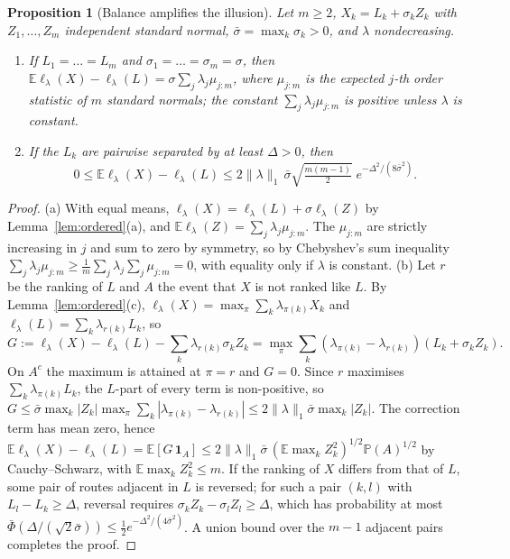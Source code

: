 \documentclass[11pt]{article}
\newtheorem{proposition}[theorem]{Proposition}
\theoremstyle{definition}
\newcommand{\E}{\mathbb{E}}
\newcommand{\Prob}{\mathbb{P}}
\newcommand{\lord}{\ell_\lambda}
\begin{document}
\begin{proposition}[Balance amplifies the illusion]\label{prop:balance}
Let $m\ge2$, $X_k=L_k+\sigma_kZ_k$ with $Z_1,\dots,Z_m$ independent standard
normal, $\bar\sigma=\max_k\sigma_k>0$, and $\lambda$ nondecreasing.
\begin{enumerate}
\item[(a)] If $L_1=\dots=L_m$ and $\sigma_1=\dots=\sigma_m=\sigma$, then
$\E\lord(X)-\lord(L)=\sigma\sum_j\lambda_j\mu_{j:m}$, where $\mu_{j:m}$ is the
expected $j$-th order statistic of $m$ standard normals; the constant
$\sum_j\lambda_j\mu_{j:m}$ is positive unless $\lambda$ is constant.
\item[(b)] If the $L_k$ are pairwise separated by at least $\Delta>0$, then
\[
0\le\E\lord(X)-\lord(L)\le 2\|\lambda\|_1\,\bar\sigma\sqrt{\tfrac{m(m-1)}{2}}\;e^{-\Delta^2/(8\bar\sigma^2)} .
\]
\end{enumerate}
\end{proposition}
\begin{proof}
(a) With equal means, $\lord(X)=\lord(L)+\sigma\lord(Z)$ by
Lemma~\ref{lem:ordered}(a), and $\E\lord(Z)=\sum_j\lambda_j\mu_{j:m}$. The
$\mu_{j:m}$ are strictly increasing in $j$ and sum to zero by symmetry, so by
Chebyshev's sum inequality $\sum_j\lambda_j\mu_{j:m}\ge\frac1m\sum_j\lambda_j\sum_j\mu_{j:m}=0$,
with equality only if $\lambda$ is constant.
(b) Let $r$ be the ranking of $L$ and $A$ the event that $X$ is not ranked
like $L$. By Lemma~\ref{lem:ordered}(c),
$\lord(X)=\max_\pi\sum_k\lambda_{\pi(k)}X_k$ and $\lord(L)=\sum_k\lambda_{r(k)}L_k$, so
\[
G:=\lord(X)-\lord(L)-\sum_k\lambda_{r(k)}\sigma_kZ_k
=\max_\pi\sum_k(\lambda_{\pi(k)}-\lambda_{r(k)})(L_k+\sigma_kZ_k).
\]
On $A^c$ the maximum is attained at $\pi=r$ and $G=0$. Since $r$ maximises
$\sum_k\lambda_{\pi(k)}L_k$, the $L$-part of every term is non-positive, so
$G\le\bar\sigma\max_k|Z_k|\max_\pi\sum_k|\lambda_{\pi(k)}-\lambda_{r(k)}|\le2\|\lambda\|_1\bar\sigma\max_k|Z_k|$.
The correction term has mean zero, hence
$\E\lord(X)-\lord(L)=\E[G\,\mathbf 1_A]\le2\|\lambda\|_1\bar\sigma\,(\E\max_kZ_k^2)^{1/2}\Prob(A)^{1/2}$
by Cauchy--Schwarz, with $\E\max_kZ_k^2\le m$. If the ranking of $X$
differs from that of $L$, some pair of routes adjacent in $L$ is reversed; for
such a pair $(k,l)$ with $L_l-L_k\ge\Delta$, reversal requires
$\sigma_kZ_k-\sigma_lZ_l\ge\Delta$, which has probability at most
$\bar\Phi(\Delta/(\sqrt2\bar\sigma))\le\frac12e^{-\Delta^2/(4\bar\sigma^2)}$. A union
bound over the $m-1$ adjacent pairs completes the proof.
\end{proof}
\end{document}
